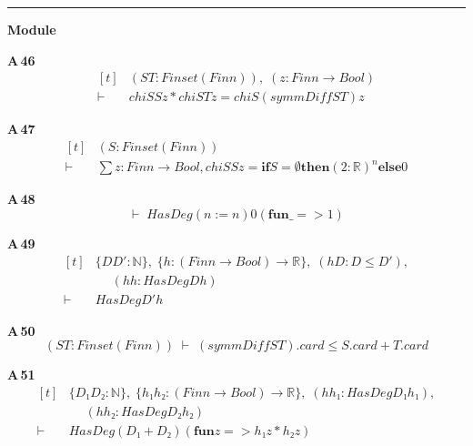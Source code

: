 \vspace{4pt}\noindent\rule{\columnwidth}{0.4pt}\par\vspace{2pt}
\noindent\textbf{Module }\par\vspace{3pt}

\noindent\textbf{A\,46}\quad{}
{\footnotesize\[ \begin{aligned}[t]
&(\mathit{S} \mathit{T} : \mathit{Finset} (\mathit{Fin} \mathit{n})),\; (\mathit{z} : \mathit{Fin} \mathit{n} \to \mathit{Bool})\\
\vdash\;&\mathit{chiS} \mathit{S} \mathit{z} * \mathit{chiS} \mathit{T} \mathit{z} = \mathit{chiS} (\mathit{symmDiff} \mathit{S} \mathit{T}) \mathit{z}
\end{aligned} \]}

\noindent\textbf{A\,47}\quad{}
{\footnotesize\[ \begin{aligned}[t]
&(\mathit{S} : \mathit{Finset} (\mathit{Fin} \mathit{n}))\\
\vdash\;&\textstyle\sum \mathit{z} : \mathit{Fin} \mathit{n} \to \mathit{Bool}, \mathit{chiS} \mathit{S} \mathit{z} = \mathbf{if} \mathit{S} = \emptyset \mathbf{then} (2 : \mathbb{R} ) ^{\mathit{n}} \mathbf{else} 0
\end{aligned} \]}

\noindent\textbf{A\,48}\quad{}
{\footnotesize\[ \vdash\; \mathit{HasDeg} (\mathit{n} := \mathit{n}) 0 (\mathbf{fun} \mathit{\_} => 1) \]}

\noindent\textbf{A\,49}\quad{}
{\footnotesize\[ \begin{aligned}[t]
&\{ \mathit{D} \mathit{D'} : \mathbb{N} \},\; \{ \mathit{h} : (\mathit{Fin} \mathit{n} \to \mathit{Bool}) \to \mathbb{R} \},\; (\mathit{hD} : \mathit{D} \leq \mathit{D'}),\\
&\quad \; (\mathit{hh} : \mathit{HasDeg} \mathit{D} \mathit{h})\\
\vdash\;&\mathit{HasDeg} \mathit{D'} \mathit{h}
\end{aligned} \]}

\noindent\textbf{A\,50}\quad{}
{\footnotesize\[ (\mathit{S} \mathit{T} : \mathit{Finset} (\mathit{Fin} \mathit{n})) \;\vdash\; (\mathit{symmDiff} \mathit{S} \mathit{T}).\mathit{card} \leq \mathit{S}.\mathit{card} + \mathit{T}.\mathit{card} \]}

\noindent\textbf{A\,51}\quad{}
{\footnotesize\[ \begin{aligned}[t]
&\{ \mathit{D₁} \mathit{D₂} : \mathbb{N} \},\; \{ \mathit{h₁} \mathit{h₂} : (\mathit{Fin} \mathit{n} \to \mathit{Bool}) \to \mathbb{R} \},\; (\mathit{hh₁} : \mathit{HasDeg} \mathit{D₁} \mathit{h₁}),\\
&\quad \; (\mathit{hh₂} : \mathit{HasDeg} \mathit{D₂} \mathit{h₂})\\
\vdash\;&\mathit{HasDeg} (\mathit{D₁} + \mathit{D₂}) (\mathbf{fun} \mathit{z} => \mathit{h₁} \mathit{z} * \mathit{h₂} \mathit{z})
\end{aligned} \]}


